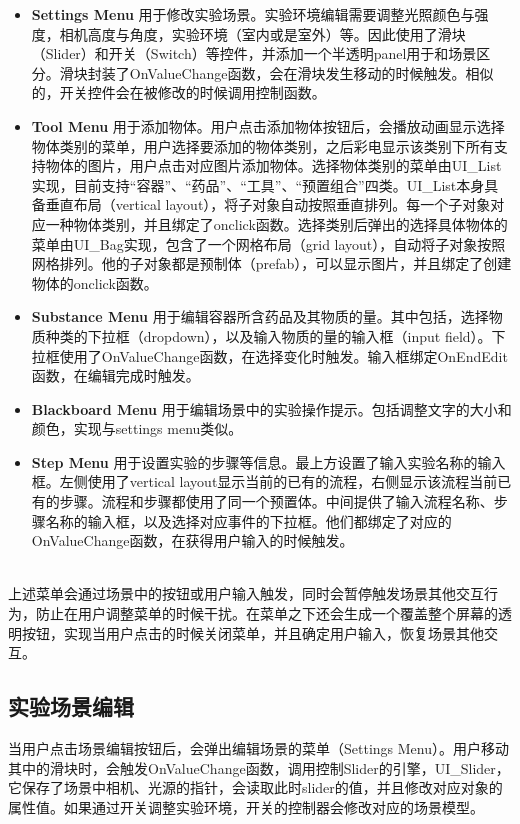 \begin{itemize}
    \item \textbf{Settings Menu}
用于修改实验场景。实验环境编辑需要调整光照颜色与强度，相机高度与角度，实验环境（室内或是室外）等。因此使用了滑块（Slider）和开关（Switch）等控件，并添加一个半透明panel用于和场景区分。滑块封装了OnValueChange函数，会在滑块发生移动的时候触发。相似的，开关控件会在被修改的时候调用控制函数。
    
    \item \textbf{Tool Menu}
用于添加物体。用户点击添加物体按钮后，会播放动画显示选择物体类别的菜单，用户选择要添加的物体类别，之后彩电显示该类别下所有支持物体的图片，用户点击对应图片添加物体。选择物体类别的菜单由UI\_List实现，目前支持“容器”、“药品”、“工具”、“预置组合”四类。UI\_List本身具备垂直布局（vertical layout），将子对象自动按照垂直排列。每一个子对象对应一种物体类别，并且绑定了onclick函数。选择类别后弹出的选择具体物体的菜单由UI\_Bag实现，包含了一个网格布局（grid layout），自动将子对象按照网格排列。他的子对象都是预制体（prefab），可以显示图片，并且绑定了创建物体的onclick函数。
    
    \item \textbf{Substance Menu}
用于编辑容器所含药品及其物质的量。其中包括，选择物质种类的下拉框（dropdown），以及输入物质的量的输入框（input field）。下拉框使用了OnValueChange函数，在选择变化时触发。输入框绑定OnEndEdit函数，在编辑完成时触发。

    \item \textbf{Blackboard Menu}
用于编辑场景中的实验操作提示。包括调整文字的大小和颜色，实现与settings menu类似。
    
    \item \textbf{Step Menu}
用于设置实验的步骤等信息。最上方设置了输入实验名称的输入框。左侧使用了vertical layout显示当前的已有的流程，右侧显示该流程当前已有的步骤。流程和步骤都使用了同一个预置体。中间提供了输入流程名称、步骤名称的输入框，以及选择对应事件的下拉框。他们都绑定了对应的OnValueChange函数，在获得用户输入的时候触发。
\end{itemize}
~\\
\indent    	上述菜单会通过场景中的按钮或用户输入触发，同时会暂停触发场景其他交互行为，防止在用户调整菜单的时候干扰。在菜单之下还会生成一个覆盖整个屏幕的透明按钮，实现当用户点击的时候关闭菜单，并且确定用户输入，恢复场景其他交互。

\subsection{实验场景编辑}
当用户点击场景编辑按钮后，会弹出编辑场景的菜单（Settings Menu）。用户移动其中的滑块时，会触发OnValueChange函数，调用控制Slider的引擎，UI\_Slider，它保存了场景中相机、光源的指针，会读取此时slider的值，并且修改对应对象的属性值。如果通过开关调整实验环境，开关的控制器会修改对应的场景模型。

